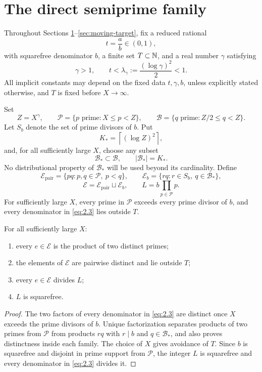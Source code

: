 \section{The direct semiprime family}\label{sec:direct-family}

Throughout Sections \ref{sec:direct-family}--\ref{sec:moving-target}, fix a reduced rational
\[
t=\frac ab\in(0,1),
\]
with squarefree denominator $b$, a finite set $T\subset\mathbb N$, and a real number $\gamma$ satisfying
\[
\gamma>1,
\qquad
t<\lambda_\gamma:=\frac{(\log\gamma)^2}{2}<1.
\tag{2.1}\label{eq:2.1}
\]
All implicit constants may depend on the fixed data $t,\gamma,b$, unless explicitly stated otherwise, and $T$ is fixed before $X\to\infty$.

Set
\[
Z=X^\gamma,
\qquad
\mathcal P=\{p\text{ prime}:X\le p<Z\},
\qquad
\mathcal B=\{q\text{ prime}:Z/2\le q<Z\}.
\tag{2.2}\label{eq:2.2}
\]
Let $S_b$ denote the set of prime divisors of $b$. Put
\[
K_*=\left\lceil(\log Z)^2\right\rceil,
\]
and, for all sufficiently large $X$, choose any subset
\[
\mathcal B_*\subset\mathcal B,
\qquad |\mathcal B_*|=K_*.
\]
No distributional property of $\mathcal B_*$ will be used beyond its cardinality. Define
\[
\mathcal E_{\mathrm{pair}}
=
\{pq:p,q\in\mathcal P,\ p<q\},
\qquad
\mathcal E_b
=
\{rq:r\in S_b,\ q\in\mathcal B_*\},
\tag{2.3}\label{eq:2.3}
\]
\[
\mathcal E
=
\mathcal E_{\mathrm{pair}}\sqcup\mathcal E_b,
\qquad
L=b\prod_{p\in\mathcal P}p.
\tag{2.4}\label{eq:2.4}
\]
For sufficiently large $X$, every prime in $\mathcal P$ exceeds every prime divisor of $b$, and every denominator in \eqref{eq:2.3} lies outside $T$.

\begin{lemma}\label{lem:arithmetic-shape}
For all sufficiently large $X$:
\begin{enumerate}[label=\textup{(\roman*)}]
\item every $e\in\mathcal E$ is the product of two distinct primes;
\item the elements of $\mathcal E$ are pairwise distinct and lie outside $T$;
\item every $e\in\mathcal E$ divides $L$;
\item $L$ is squarefree.
\end{enumerate}
\end{lemma}

\begin{proof}
The two factors of every denominator in \eqref{eq:2.3} are distinct once $X$ exceeds the prime divisors of $b$. Unique factorization separates products of two primes from $\mathcal P$ from products $rq$ with $r\mid b$ and $q\in\mathcal B_*$, and also proves distinctness inside each family. The choice of $X$ gives avoidance of $T$. Since $b$ is squarefree and disjoint in prime support from $\mathcal P$, the integer $L$ is squarefree and every denominator in \eqref{eq:2.3} divides it.
\end{proof}

